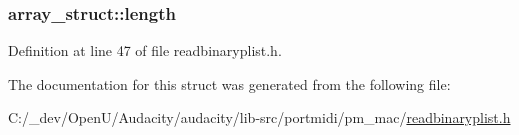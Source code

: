 \subsubsection[{\texorpdfstring{length}{length}}]{ array\+\_\+struct\+::length}\hypertarget{structarray__struct_a2cc7486bd91ad9da51edd7a4cbc46a35}{}\label{structarray__struct_a2cc7486bd91ad9da51edd7a4cbc46a35}


Definition at line 47 of file readbinaryplist.\+h.



The documentation for this struct was generated from the following file\+:\begin{DoxyCompactItemize}
\item 
C\+:/\+\_\+dev/\+Open\+U/\+Audacity/audacity/lib-\/src/portmidi/pm\+\_\+mac/\hyperlink{readbinaryplist_8h}{readbinaryplist.\+h}\end{DoxyCompactItemize}
